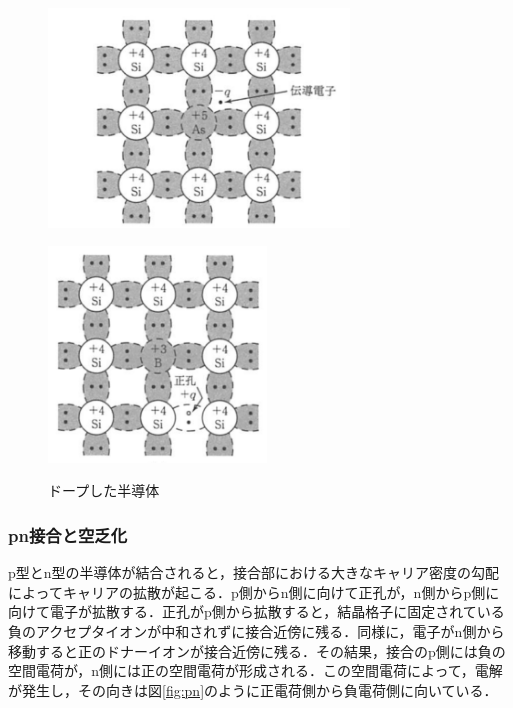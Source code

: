 \begin{figure}[h]
  \centering
  \begin{minipage}[b]{0.45\linewidth}
    \centering
    \includegraphics[width=8cm]{./figure/donner.png}
    \label{fig:Donner}
  \end{minipage}
  \begin{minipage}[b]{0.45\linewidth}
    \centering
    \includegraphics[width=5.8cm]{./figure/accepta.png}
    \label{fig:Acceptor}
  \end{minipage}
  \caption{ドープした半導体\cite{SMSze}}
\end{figure}


\subsubsection*{pn接合と空乏化}
p型とn型の半導体が結合されると，接合部における大きなキャリア密度の勾配によってキャリアの拡散が起こる．p側からn側に向けて正孔が，n側からp側に向けて電子が拡散する．正孔がp側から拡散すると，結晶格子に固定されている負のアクセプタイオンが中和されずに接合近傍に残る．同様に，電子がn側から移動すると正のドナーイオンが接合近傍に残る．その結果，接合のp側には負の空間電荷が，n側には正の空間電荷が形成される．この空間電荷によって，電解が発生し，その向きは図\ref{fig:pn}のように正電荷側から負電荷側に向いている．\par

